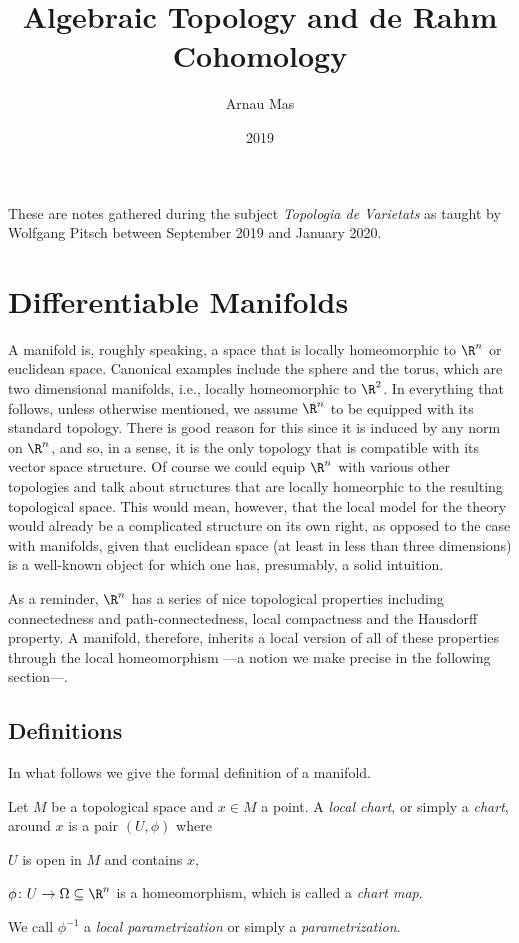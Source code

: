 \documentclass[12pt,oneside]{book}
\title{Algebraic Topology and de Rahm Cohomology}
\author{Arnau Mas}
\date{2019}
\begin{document}
\maketitle

\frontmatter
\pagestyle{plain}
These are notes gathered during the subject \emph{Topologia de Varietats} as taught by Wolfgang Pitsch between September 2019 and January 2020.

\mainmatter

\chapter{Differentiable Manifolds}

A manifold is, roughly speaking, a space that is locally homeomorphic
to \( \R^n \) or euclidean space. Canonical examples include the
sphere and the torus, which are two dimensional manifolds, i.e.,
locally homeomorphic to \( \R^2 \). In everything that follows, unless
otherwise mentioned, we assume \( \R^n \) to be equipped with its
standard topology. There is good reason for this since it is induced
by any norm on \( \R^n \), and so, in a sense, it is the only topology
that is compatible with its vector space structure. Of course we could
equip \( \R^n \) with various other topologies and talk about
structures that are locally homeorphic to the resulting topological
space. This would mean, however, that the local model for the theory
would already be a complicated structure on its own right, as opposed
to the case with manifolds, given that euclidean space (at least in
less than three dimensions) is a well-known object for which one has,
presumably, a solid intuition.  


As a reminder, \( \R^n \) has a series of nice topological properties including connectedness and path-connectedness, local compactness and the Hausdorff property. A manifold, therefore, inherits a local version of all of these properties through the local homeomorphism ---a notion we make precise in the following section---.

\section{Definitions}
In what follows we give the formal definition of a manifold. 
\begin{definition}
	Let \( M \) be a topological space and \( x \in M \) a point. A \emph{local chart}, or simply a \emph{chart}, around \( x \) is a pair \( (U, \phi) \)  where
	\begin{points}
	\item \( U \) is open in \( M \) and contains \( x \),
	\item \( \phi \colon U \to \Omega \subseteq \R^n \) is a homeomorphism, which is called a \emph{chart map}.
	\end{points}
	We call \( \phi^{-1} \) a \emph{local parametrization} or simply a \emph{parametrization}.
\end{definition}
\end{document}
